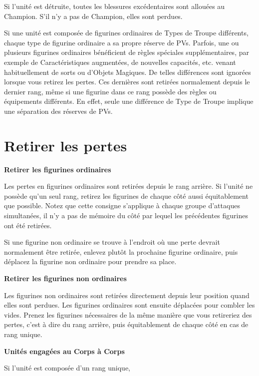 Si l'unité est détruite, toutes les blessures excédentaires sont allouées au Champion. S'il n'y a pas de Champion, elles sont perdues.

Si une unité est composée de figurines ordinaires de Types de Troupe différents, chaque type de figurine ordinaire a sa propre réserve de PVs. Parfois, une ou plusieurs figurines ordinaires bénéficient de règles spéciales supplémentaires, par exemple de Caractéristiques augmentées, de nouvelles capacités, etc. venant habituellement de sorts ou d'Objets Magiques. De telles différences sont ignorées lorsque vous retirez les pertes. Ces dernières sont retirées normalement depuis le dernier rang, même si une figurine dans ce rang possède des règles ou équipements différents. En effet, seule une différence de Type de Troupe implique une séparation des réserves de PVs. 

\newpage
\section{Retirer les pertes}

\noindent\textbf{Retirer les figurines ordinaires}

Les pertes en figurines ordinaires sont retirées depuis le rang arrière. Si l'unité ne possède qu'un seul rang, retirez les figurines de chaque côté aussi équitablement que possible. Notez que cette consigne s'applique à chaque groupe d'attaques simultanées, il n'y a pas de \og mémoire \fg{} du côté par lequel les précédentes figurines ont été retirées.

Si une figurine non ordinaire se trouve à l'endroit où une perte devrait normalement être retirée, enlevez plutôt la prochaine figurine ordinaire, puis déplacez la figurine non ordinaire pour prendre sa place.

\noindent\textbf{Retirer les figurines non ordinaires}

Les figurines non ordinaires sont retirées directement depuis leur position quand elles sont perdues. Les figurines ordinaires sont ensuite déplacées pour combler les vides. Prenez les figurines nécessaires de la même manière que vous retireriez des pertes, c'est à dire du rang arrière, puis équitablement de chaque côté en cas de rang unique.

\noindent\textbf{Unités engagées au Corps à Corps}

Si l'unité est composée d'un rang unique, 

